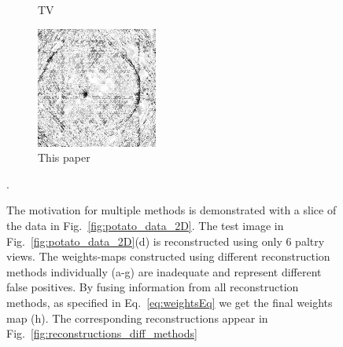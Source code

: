 \documentclass[journal]{IEEEtran}
\begin{document}
\begin{figure}[!h]
\begin{subfigure}[b]{0.24\linewidth}
        \caption{TV}
     \end{subfigure}
    \begin{subfigure}[b]{0.24\linewidth}
        \includegraphics[width=\textwidth]{../images/potato/post_tci/comparison/weightsIm_all_methods30.png}
        \caption{This paper}
     \end{subfigure}
      \caption{The motivation for multiple methods is demonstrated
        with a slice of the data in Fig.~\ref{fig:potato_data_2D}.
        The test image in Fig.~\ref{fig:potato_data_2D}(d) is
        reconstructed using only $6$ paltry views.  The weights-maps
        constructed using different
        reconstruction methods individually (a-g) are inadequate and
        represent different false positives. By fusing information
        from all reconstruction methods, as specified in
        Eq.~\ref{eq:weightsEq} we get the final weights map (h). The corresponding reconstructions appear in Fig.~\ref{fig:reconstructions_diff_methods}}.
\label{fig:weights_map_2Dpotato}
\end{figure}
\end{document}
